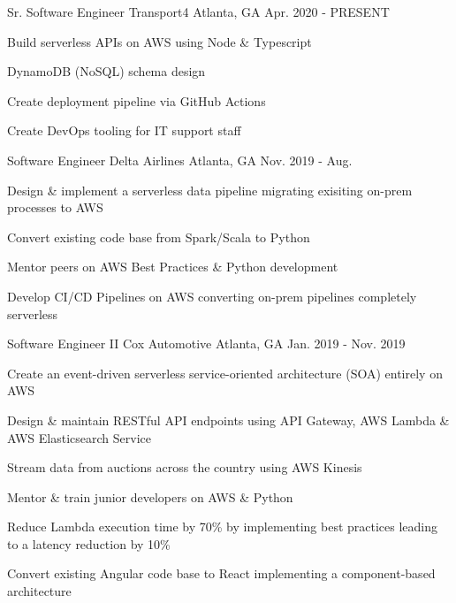 
\begin{cventries}
  \cventry
    {Sr. Software Engineer} %
    {Transport4} %
    {Atlanta, GA} %
    {Apr. 2020 - PRESENT} %
    {
      \begin{cvitems} %
        \item {Build serverless APIs on AWS using Node \& Typescript}
        \item {DynamoDB (NoSQL) schema design}
        \item {Create deployment pipeline via GitHub Actions}
        \item {Create DevOps tooling for IT support staff}
      \end{cvitems}
    }
    
  \cventry
    {Software Engineer} %
    {Delta Airlines} %
    {Atlanta, GA} %
    {Nov. 2019 - Aug.} %
    {
      \begin{cvitems} %
        \item {Design \& implement a serverless data pipeline migrating exisiting on-prem processes to AWS}
        \item {Convert existing code base from Spark/Scala to Python}
        \item {Mentor peers on AWS Best Practices \& Python development}
        \item {Develop CI/CD Pipelines on AWS converting on-prem pipelines completely serverless}
      \end{cvitems}
    }

  \cventry
    {Software Engineer II} %
    {Cox Automotive} %
    {Atlanta, GA} %
    {Jan. 2019 - Nov. 2019} %
    {
      \begin{cvitems} %
        \item {Create an event-driven serverless service-oriented architecture (SOA) entirely on AWS}
        \item {Design \& maintain RESTful API endpoints using API Gateway, AWS Lambda \& AWS Elasticsearch Service}
        \item {Stream data from auctions across the country using AWS Kinesis}
        \item {Mentor \& train junior developers on AWS \& Python}
        \item {Reduce Lambda execution time by 70\% by implementing best practices leading to a latency reduction by 10\%}
        \item {Convert existing Angular code base to React implementing a component-based architecture}
      \end{cvitems}
    }


\end{cventries}
